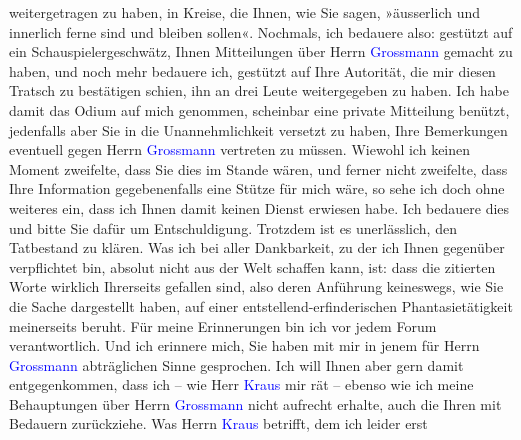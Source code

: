                     weitergetragen zu haben, in Kreise, die Ihnen, wie Sie sagen, »äusserlich und
                    innerlich ferne sind und bleiben sollen«.\pend
           \pstart
           Nochmals, ich bedauere also: gestützt auf ein Schauspielergeschwätz, Ihnen
                    Mitteilungen über Herrn \textcolor{blue}{Grossmann}{}\ledrightnote{\textcolor{blue}{Stefan Großmann}} gemacht zu
                    haben, und noch mehr bedauere ich, gestützt auf Ihre Autorität, die mir diesen
                    Tratsch zu bestätigen schien, ihn an drei Leute weitergegeben zu haben. Ich habe
                    damit das Odium auf mich genommen, scheinbar eine private Mitteilung benützt,
                    jedenfalls aber Sie in die Unannehmlichkeit versetzt zu haben, Ihre Bemerkungen
                    eventuell gegen Herrn \textcolor{blue}{Grossmann}{}\ledrightnote{\textcolor{blue}{Stefan Großmann}} vertreten zu
                    müssen. Wiewohl ich keinen Moment zweifelte, dass Sie dies im Stande wären, und
                    ferner nicht zweifelte, dass Ihre Information gegebenenfalls eine Stütze für
                    mich wäre, so sehe ich doch ohne weiteres ein, dass ich Ihnen damit keinen
                    Dienst erwiesen habe. Ich bedauere dies und bitte Sie dafür um Entschuldigung.
                    Trotzdem ist es un{\pb}erlässlich, den Tatbestand zu
                    klären. Was ich bei aller Dankbarkeit, zu der ich Ihnen gegenüber verpflichtet
                    bin, absolut nicht aus der Welt schaffen kann, ist: dass die zitierten Worte
                    wirklich Ihrerseits gefallen sind, also deren Anführung keineswegs, wie Sie die
                    Sache dargestellt haben, auf einer entstellend-erfinderischen Phantasietätigkeit
                    meinerseits beruht. Für meine Erinnerungen bin ich vor jedem Forum
                    verantwortlich. Und ich erinnere mich, Sie haben mit mir in jenem für Herrn \textcolor{blue}{Grossmann}{}\ledrightnote{\textcolor{blue}{Stefan Großmann}} abträglichen Sinne gesprochen. Ich
                    will Ihnen aber gern damit entgegenkommen, dass ich – wie Herr \textcolor{blue}{Kraus}{}\ledrightnote{\textcolor{blue}{Karl Kraus}} mir rät – ebenso wie ich meine Behauptungen über
                    Herrn \textcolor{blue}{Grossmann}{}\ledrightnote{\textcolor{blue}{Stefan Großmann}} nicht aufrecht erhalte, auch
                    die Ihren mit Bedauern zurückziehe.\pend
           \pstart
           Was Herrn \textcolor{blue}{Kraus}{}\ledrightnote{\textcolor{blue}{Karl Kraus}} betrifft, dem ich leider erst
